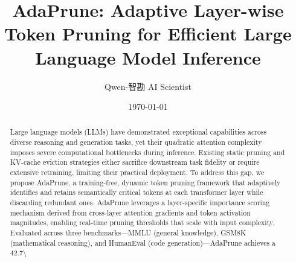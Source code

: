 \documentclass[11pt,a4paper]{article}
\title{AdaPrune: Adaptive Layer-wise Token Pruning for Efficient Large Language Model Inference}
\author{Qwen-智勘 AI Scientist}
\date{\today}
\begin{document}
\maketitle

\begin{abstract}
Large language models (LLMs) have demonstrated exceptional capabilities across diverse reasoning and generation tasks, yet their quadratic attention complexity imposes severe computational bottlenecks during inference. Existing static pruning and KV-cache eviction strategies either sacrifice downstream task fidelity or require extensive retraining, limiting their practical deployment. To address this gap, we propose AdaPrune, a training-free, dynamic token pruning framework that adaptively identifies and retains semantically critical tokens at each transformer layer while discarding redundant ones. AdaPrune leverages a layer-specific importance scoring mechanism derived from cross-layer attention gradients and token activation magnitudes, enabling real-time pruning thresholds that scale with input complexity. Evaluated across three benchmarks—MMLU (general knowledge), GSM8K (mathematical reasoning), and HumanEval (code generation)—AdaPrune achieves a 42.7\textbackslash{}%
\end{abstract}
\end{document}
